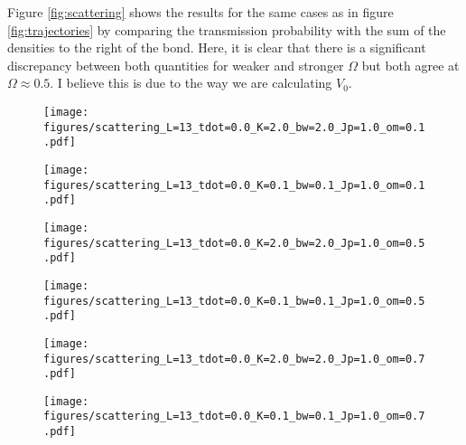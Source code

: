 \documentclass{article}
\begin{document}
Figure \ref{fig:scattering} shows the results for the same cases as in figure \ref{fig:trajectories} by comparing the transmission probability with the sum of the densities to the right of the bond. Here, it is clear that there is a significant discrepancy between both quantities for weaker and stronger $\Omega$ but both agree at $\Omega \approx 0.5$. I believe this is due to the way we are calculating $V_0$.

\begin{figure*}[htb]
    \centering %
 \begin{subfigure}{0.4\textwidth}\hfill
 \caption{}
  \texttt{[image: figures/scattering\_L=13\_tdot=0.0\_K=2.0\_bw=2.0\_Jp=1.0\_om=0.1.pdf]}
\end{subfigure} %
\begin{subfigure}{0.4\textwidth}\hfill
  \caption{}
  \texttt{[image: figures/scattering\_L=13\_tdot=0.0\_K=0.1\_bw=0.1\_Jp=1.0\_om=0.1.pdf]}
\end{subfigure}%

\centering %
 \begin{subfigure}{0.4\textwidth}\hfill
   \caption{}
  \texttt{[image: figures/scattering\_L=13\_tdot=0.0\_K=2.0\_bw=2.0\_Jp=1.0\_om=0.5.pdf]}
\end{subfigure} %
\begin{subfigure}{0.4\textwidth}\hfill
  \caption{}
  \texttt{[image: figures/scattering\_L=13\_tdot=0.0\_K=0.1\_bw=0.1\_Jp=1.0\_om=0.5.pdf]}
\end{subfigure}%

\centering %
 \begin{subfigure}{0.4\textwidth}\hfill
   \caption{}
  \texttt{[image: figures/scattering\_L=13\_tdot=0.0\_K=2.0\_bw=2.0\_Jp=1.0\_om=0.7.pdf]}
\end{subfigure} %
\begin{subfigure}{0.4\textwidth}\hfill
  \caption{}
  \texttt{[image: figures/scattering\_L=13\_tdot=0.0\_K=0.1\_bw=0.1\_Jp=1.0\_om=0.7.pdf]}
\end{subfigure}%
\caption{Comparison between the sum of the densities to the left of the bond (solid blue line) to the scattering transmission probabilities (red line and dashed line). The vertical lines show the hitting times. The examples correspond to those shown in \ref{fig:trajectories}.}\label{fig:scattering}
\end{figure*}
\end{document}
